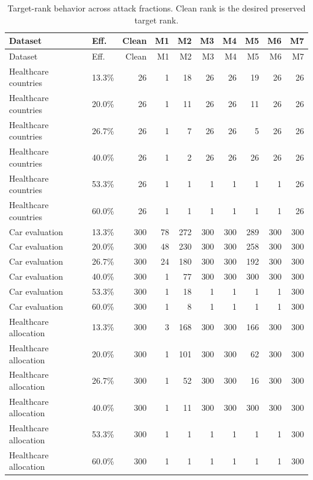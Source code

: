\begin{longtable}{llrrrrrrrr}
\caption{Target-rank behavior across attack fractions. Clean rank is the desired preserved target rank.}
\label{tab:attack-curve}\\
\toprule
Dataset & Eff. & Clean & M1 & M2 & M3 & M4 & M5 & M6 & M7 \\
\midrule
\endfirsthead
\toprule
Dataset & Eff. & Clean & M1 & M2 & M3 & M4 & M5 & M6 & M7 \\
\midrule
\endhead
Healthcare countries & 13.3\% & 26 & 1 & 18 & 26 & 26 & 19 & 26 & 26 \\
Healthcare countries & 20.0\% & 26 & 1 & 11 & 26 & 26 & 11 & 26 & 26 \\
Healthcare countries & 26.7\% & 26 & 1 & 7 & 26 & 26 & 5 & 26 & 26 \\
Healthcare countries & 40.0\% & 26 & 1 & 2 & 26 & 26 & 26 & 26 & 26 \\
Healthcare countries & 53.3\% & 26 & 1 & 1 & 1 & 1 & 1 & 1 & 26 \\
Healthcare countries & 60.0\% & 26 & 1 & 1 & 1 & 1 & 1 & 1 & 26 \\
Car evaluation & 13.3\% & 300 & 78 & 272 & 300 & 300 & 289 & 300 & 300 \\
Car evaluation & 20.0\% & 300 & 48 & 230 & 300 & 300 & 258 & 300 & 300 \\
Car evaluation & 26.7\% & 300 & 24 & 180 & 300 & 300 & 192 & 300 & 300 \\
Car evaluation & 40.0\% & 300 & 1 & 77 & 300 & 300 & 300 & 300 & 300 \\
Car evaluation & 53.3\% & 300 & 1 & 18 & 1 & 1 & 1 & 1 & 300 \\
Car evaluation & 60.0\% & 300 & 1 & 8 & 1 & 1 & 1 & 1 & 300 \\
Healthcare allocation & 13.3\% & 300 & 3 & 168 & 300 & 300 & 166 & 300 & 300 \\
Healthcare allocation & 20.0\% & 300 & 1 & 101 & 300 & 300 & 62 & 300 & 300 \\
Healthcare allocation & 26.7\% & 300 & 1 & 52 & 300 & 300 & 16 & 300 & 300 \\
Healthcare allocation & 40.0\% & 300 & 1 & 11 & 300 & 300 & 300 & 300 & 300 \\
Healthcare allocation & 53.3\% & 300 & 1 & 1 & 1 & 1 & 1 & 1 & 300 \\
Healthcare allocation & 60.0\% & 300 & 1 & 1 & 1 & 1 & 1 & 1 & 300 \\
\bottomrule
\end{longtable}
